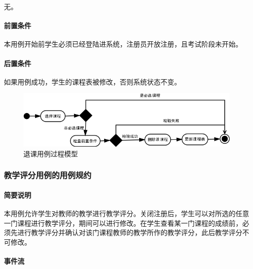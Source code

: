 无。
  
\paragraph{前置条件}
  
本用例开始前学生必须已经登陆进系统，注册员开放注册，且考试阶段未开始。
  
\paragraph{后置条件}
  
如果用例成功，学生的课程表被修改，否则系统状态不变。

\begin{figure}[H]
  \centering
  \includegraphics[scale=0.7]{img/jwxt_dcourse.png}
  \caption{退课用例过程模型}
\end{figure}

\subsubsection{教学评分用例的用例规约}

\paragraph{简要说明}
  
本用例允许学生对教师的教学进行教学评分。关闭注册后，学生可以对所选的任意一门课程进行教学评分，期间可以进行修改。在学生查看某一门课程的成绩前，必须先进行教学评分并确认对该门课程教师的教学所作的教学评分，此后教学评分不可修改。
  
\paragraph{事件流}
  
